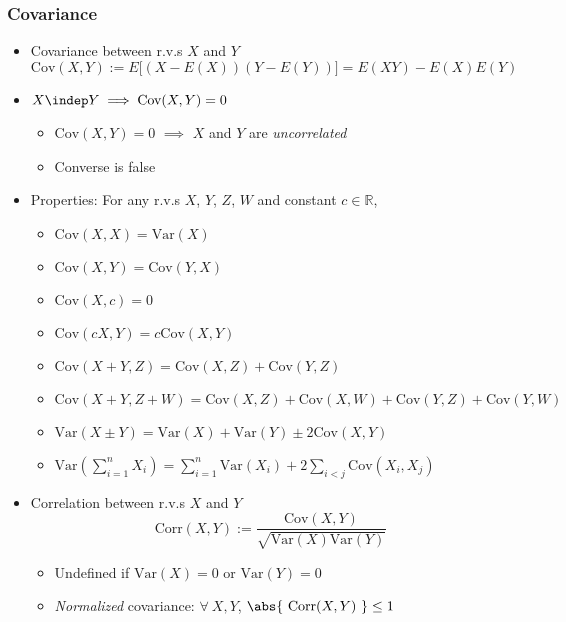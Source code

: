 \subsubsection*{Covariance}
\begin{itemize}
    \item Covariance between r.v.s $X$ and $Y$
    \begin{equation}
        \text{Cov}(X,Y):=E\Bigr[(X-E(X))(Y-E(Y))\Bigr]=E(XY)-E(X)E(Y)
    \end{equation}
    \item $X\indep Y\implies\text{Cov}(X,Y)=0$
    \begin{itemize}
        \item $\text{Cov}(X,Y)=0$ $\implies$ $X$ and $Y$ are \textit{uncorrelated}
        \item Converse is false
    \end{itemize}
    \item Properties: For any r.v.s $X$, $Y$, $Z$, $W$ and constant $c\in\mathbb{R}$,
    \begin{itemize}
        \item $\text{Cov}(X,X)=\text{Var}(X)$
        \item $\text{Cov}(X,Y)=\text{Cov}(Y,X)$
        \item $\text{Cov}(X,c)=0$
        \item $\text{Cov}(cX,Y)=c\text{Cov}(X,Y)$
        \item $\text{Cov}(X+Y,Z)=\text{Cov}(X,Z)+\text{Cov}(Y,Z)$
        \item $\text{Cov}(X+Y,Z+W)=\text{Cov}(X,Z)+\text{Cov}(X,W)+\text{Cov}(Y,Z)+\text{Cov}(Y,W)$
        \item $\text{Var}(X\pm Y)=\text{Var}(X)+\text{Var}(Y)\pm 2\text{Cov}(X,Y)$
        \item $\text{Var}\left(\sum_{i=1}^nX_i\right)=\sum_{i=1}^n\text{Var}(X_i)+2\sum_{i<j}\text{Cov}(X_i,X_j)$
    \end{itemize}
    \item Correlation between r.v.s $X$ and $Y$
    \begin{equation}
        \text{Corr}(X,Y):=\frac{\text{Cov}(X,Y)}{\sqrt{\text{Var}(X)\text{Var}(Y)}}
    \end{equation}
    \begin{itemize}
        \item Undefined if $\text{Var}(X)=0$ or $\text{Var}(Y)=0$
        \item \textit{Normalized} covariance: $\forall~X,Y$, $\abs{~\text{Corr}(X,Y)~}\leq 1$
    \end{itemize}
\end{itemize}

